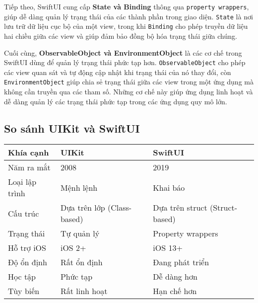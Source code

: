 Tiếp theo, SwiftUI cung cấp \textbf{State và Binding} thông qua \texttt{property wrappers}, giúp dễ dàng quản lý trạng thái của các thành phần trong giao diện. \texttt{State} là nơi lưu trữ dữ liệu cục bộ của một view, trong khi \texttt{Binding} cho phép truyền dữ liệu hai chiều giữa các view và giúp đảm bảo đồng bộ hóa trạng thái giữa chúng.

Cuối cùng, \textbf{ObservableObject và EnvironmentObject}\cite{ObservableObject} là các cơ chế trong SwiftUI dùng để quản lý trạng thái phức tạp hơn. \texttt{ObservableObject} cho phép các view quan sát và tự động cập nhật khi trạng thái của nó thay đổi, còn \texttt{EnvironmentObject} giúp chia sẻ trạng thái giữa các view trong một ứng dụng mà không cần truyền qua các tham số. Những cơ chế này giúp ứng dụng linh hoạt và dễ dàng quản lý các trạng thái phức tạp trong các ứng dụng quy mô lớn.

\subsection{So sánh UIKit và SwiftUI}

\begin{center}
\begin{tabular}{|l|l|l|}
\hline
\textbf{Khía cạnh} & \textbf{UIKit} & \textbf{SwiftUI} \\
\hline
Năm ra mắt & 2008 & 2019 \\
\hline
Loại lập trình & Mệnh lệnh & Khai báo \\
\hline
Cấu trúc & Dựa trên lớp (Class-based) & Dựa trên struct (Struct-based) \\
\hline
Trạng thái & Tự quản lý & Property wrappers \\
\hline
Hỗ trợ iOS & iOS 2+ & iOS 13+ \\
\hline
Độ ổn định & Rất ổn định & Đang phát triển \\
\hline
Học tập & Phức tạp & Dễ dàng hơn \\
\hline
Tùy biến & Rất linh hoạt & Hạn chế hơn \\
\hline
\end{tabular}
\end{center}
